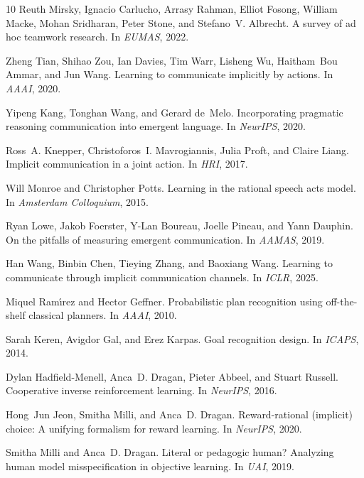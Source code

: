 \documentclass[sigconf,review,anonymous]{acmart}
\begin{document}
\begin{thebibliography}{10}
Reuth Mirsky, Ignacio Carlucho, Arrasy Rahman, Elliot Fosong, William Macke, Mohan Sridharan, Peter Stone, and Stefano~V. Albrecht.
\newblock A survey of ad hoc teamwork research.
\newblock In {\em EUMAS}, 2022.

Zheng Tian, Shihao Zou, Ian Davies, Tim Warr, Lisheng Wu, Haitham~Bou Ammar, and Jun Wang.
\newblock Learning to communicate implicitly by actions.
\newblock In {\em AAAI}, 2020.

Yipeng Kang, Tonghan Wang, and Gerard de~Melo.
\newblock Incorporating pragmatic reasoning communication into emergent language.
\newblock In {\em NeurIPS}, 2020.

Ross~A. Knepper, Christoforos~I. Mavrogiannis, Julia Proft, and Claire Liang.
\newblock Implicit communication in a joint action.
\newblock In {\em HRI}, 2017.

Will Monroe and Christopher Potts.
\newblock Learning in the rational speech acts model.
\newblock In {\em Amsterdam Colloquium}, 2015.

Ryan Lowe, Jakob Foerster, Y-Lan Boureau, Joelle Pineau, and Yann Dauphin.
\newblock On the pitfalls of measuring emergent communication.
\newblock In {\em AAMAS}, 2019.

Han Wang, Binbin Chen, Tieying Zhang, and Baoxiang Wang.
\newblock Learning to communicate through implicit communication channels.
\newblock In {\em ICLR}, 2025.

Miquel Ram{\'\i}rez and Hector Geffner.
\newblock Probabilistic plan recognition using off-the-shelf classical planners.
\newblock In {\em AAAI}, 2010.

Sarah Keren, Avigdor Gal, and Erez Karpas.
\newblock Goal recognition design.
\newblock In {\em ICAPS}, 2014.

Dylan Hadfield-Menell, Anca~D. Dragan, Pieter Abbeel, and Stuart Russell.
\newblock Cooperative inverse reinforcement learning.
\newblock In {\em NeurIPS}, 2016.

Hong~Jun Jeon, Smitha Milli, and Anca~D. Dragan.
\newblock Reward-rational (implicit) choice: A unifying formalism for reward learning.
\newblock In {\em NeurIPS}, 2020.

Smitha Milli and Anca~D. Dragan.
\newblock Literal or pedagogic human? Analyzing human model misspecification in objective learning.
\newblock In {\em UAI}, 2019.


\end{thebibliography}
\end{document}

